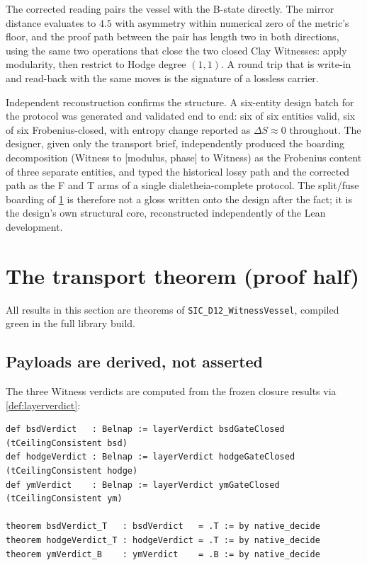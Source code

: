 \documentclass[12pt,a4paper]{article}
\newcommand{\bT}{\textsf{T}}
\newcommand{\bF}{\textsf{F}}
\newcommand{\bB}{\textsf{B}}
\begin{document}
The corrected reading pairs the vessel with the \bB-state directly.  The mirror
distance evaluates to $4.5$ with asymmetry within numerical zero of the metric's
floor, and the proof path between the pair has length two in both directions,
using the same two operations that close the two closed Clay Witnesses: apply
modularity, then restrict to Hodge degree $(1,1)$.  A round trip that is
write-in and read-back with the same moves is the signature of a lossless
carrier.

Independent reconstruction confirms the structure.  A six-entity design batch
for the protocol was generated and validated end to end: six of six entities
valid, six of six Frobenius-closed, with entropy change reported as
$\Delta S \approx 0$ throughout.  The designer, given only the transport brief,
independently produced the boarding decomposition (Witness to [modulus, phase]
to Witness) as the Frobenius content of three separate entities, and typed the
historical lossy path and the corrected path as the \bF{} and \bT{} arms of a
single dialetheia-complete protocol.  The split/fuse boarding of \cref{sec:lean}
is therefore not a gloss written onto the design after the fact; it is the
design's own structural core, reconstructed independently of the Lean
development.

\section{The transport theorem (proof half)}
\label{sec:lean}

All results in this section are theorems of
\texttt{SIC\_D12\_WitnessVessel}, compiled green in the full library build.

\subsection{Payloads are derived, not asserted}

The three Witness verdicts are computed from the frozen closure results via
\cref{def:layerverdict}:

\begin{lstlisting}[caption={Payload derivation (excerpt).}]
def bsdVerdict   : Belnap := layerVerdict bsdGateClosed   (tCeilingConsistent bsd)
def hodgeVerdict : Belnap := layerVerdict hodgeGateClosed (tCeilingConsistent hodge)
def ymVerdict    : Belnap := layerVerdict ymGateClosed    (tCeilingConsistent ym)

theorem bsdVerdict_T   : bsdVerdict   = .T := by native_decide
theorem hodgeVerdict_T : hodgeVerdict = .T := by native_decide
theorem ymVerdict_B    : ymVerdict    = .B := by native_decide
\end{lstlisting}
\end{document}
